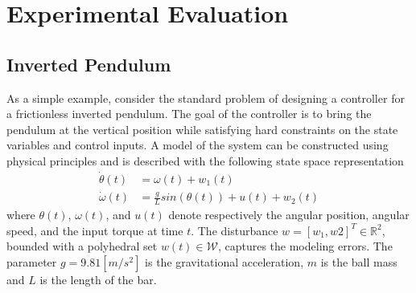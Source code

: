 
\section{Experimental Evaluation}\label{sec:experiments}
\subsection{Inverted Pendulum}\label{subsec:invpend}
As a simple example, consider the standard problem of designing a controller for a frictionless inverted pendulum.
The goal of the controller is to bring the pendulum at the vertical position while satisfying hard constraints on the state variables and control inputs.
A model of the system can be constructed using physical principles and is described with the following state space representation
\begin{align*}\label{eq:inv_pend_ss}
\dot\theta(t)&=\omega(t)+w_1(t)\nonumber\\
\dot\omega(t)&=\frac{g}{L}sin(\theta(t))+u(t)+w_2(t)
\end{align*}
where $\theta(t)$, $\omega(t)$, and $u(t)$ denote respectively the angular position, angular speed, 
and the input torque at time $t$. The disturbance $w=[w_1,w2]^T\in\mathbb R^2$, bounded with a polyhedral set $w(t)\in \mathcal W$, captures the modeling errors. 
The parameter $g=9.81 [m/s^2]$ is the gravitational acceleration, $m$ is the ball mass
and $L$ is the length of the bar. 

